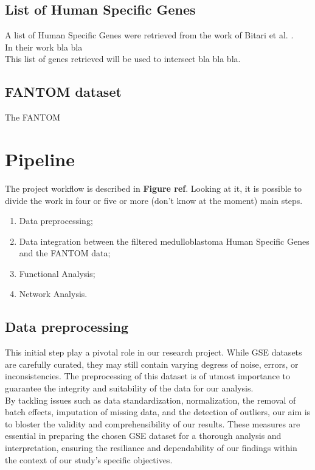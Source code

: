 \documentclass[10pt]{SelfArx} %
\begin{document}
\subsection{List of Human Specific Genes}\label{sec:list_genes}
A list of Human Specific Genes were retrieved from the work of Bitari et al. \cite{bitar2019genes}. \\
In their work bla bla \\
This list of genes retrieved will be used to intersect bla bla bla.

\subsection{FANTOM dataset}\label{sec:Fantom_dataset}
The FANTOM \cite{fantom5} 

\section{Pipeline}\label{sec:pipeline}
The project workflow is described in \textbf{Figure ref}. Looking at it, it is possible to divide the work in four or five or more (don't know at the moment) main steps.

\begin{enumerate}
    \item Data preprocessing;
    \item Data integration between the filtered medulloblastoma Human Specific Genes and the FANTOM data;
    \item Functional Analysis;
    \item Network Analysis.
\end{enumerate}

\subsection{Data preprocessing}\label{sec:pre_processing}
This initial step play a pivotal role in our research project. While GSE datasets are carefully curated, they may still contain varying degress of noise, errors, or inconsistencies. The preprocessing of this dataset is of utmost importance to guarantee the integrity and suitability of the data for our analysis. \\
By tackling issues such as data standardization, normalization, the removal of batch effects, imputation of missing data, and the detection of outliers, our aim is to bloster the validity and comprehensibility of our results. These measures are essential in preparing the chosen GSE dataset for a thorough analysis and interpretation, ensuring the resiliance and dependability of our findings within the context of our study's specific objectives.
\end{document}
